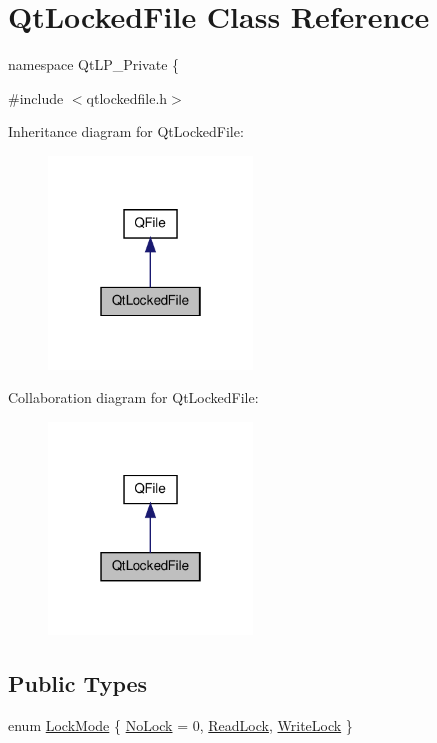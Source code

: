 \hypertarget{class_qt_locked_file}{\section{Qt\-Locked\-File Class Reference}
\label{class_qt_locked_file}
}


namespace Qt\-L\-P\-\_\-\-Private \{  




{\ttfamily \#include $<$qtlockedfile.\-h$>$}



Inheritance diagram for Qt\-Locked\-File\-:\nopagebreak
\begin{figure}[H]
\begin{center}
\leavevmode
\includegraphics[width=154pt]{class_qt_locked_file__inherit__graph}
\end{center}
\end{figure}


Collaboration diagram for Qt\-Locked\-File\-:\nopagebreak
\begin{figure}[H]
\begin{center}
\leavevmode
\includegraphics[width=154pt]{class_qt_locked_file__coll__graph}
\end{center}
\end{figure}
\subsection*{Public Types}
\begin{DoxyCompactItemize}
\item 
enum \hyperlink{class_qt_locked_file_aef385609a0a280b52334b972b04074cc}{Lock\-Mode} \{ \hyperlink{class_qt_locked_file_aef385609a0a280b52334b972b04074ccaecfd72691ebf45adb30ced8f2ce083ba}{No\-Lock} = 0, 
\hyperlink{class_qt_locked_file_aef385609a0a280b52334b972b04074ccaa7d019059a9ef326be5f044dc7b411b7}{Read\-Lock}, 
\hyperlink{class_qt_locked_file_aef385609a0a280b52334b972b04074cca780a3a586dde80736c8fe2e6c5d3cc8d}{Write\-Lock}
 \}
\end{DoxyCompactItemize}
